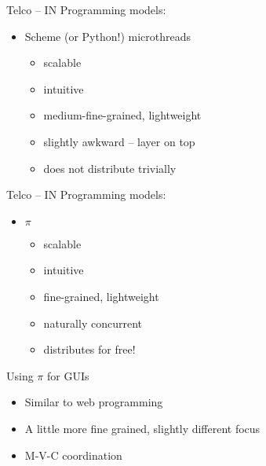 \documentclass[ps,azure]{prosper}
\begin{document}
\begin{slide}{Telco -- IN}
  Programming models:
  \begin{itemize}
  \item Scheme {\small (or Python!)} microthreads
    \begin{itemize}
    \item scalable
    \item intuitive
    \item medium-fine-grained, lightweight
    \item slightly awkward -- layer on top
    \item does not distribute trivially
    \end{itemize}
  \end{itemize}
\end{slide}

\begin{slide}{Telco -- IN}
  Programming models:
  \begin{itemize}
  \item $\pi$
    \begin{itemize}
    \item scalable
    \item intuitive
    \item fine-grained, lightweight
    \item naturally concurrent
    \item distributes for free!
    \end{itemize}
  \end{itemize}
\end{slide}


\begin{slide}{Using $\pi$ for GUIs}
  \begin{itemize}
  \item Similar to web programming
  \item A little more fine grained, slightly different focus
  \item M-V-C coordination
  \end{itemize}
\end{slide}
\end{document}
